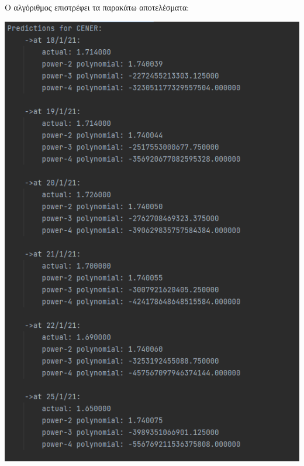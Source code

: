 \documentclass{article}
\newcommand{\gt}{\greektext}
\begin{document}
\pagebreak
\gt Ο αλγόριθμος επιστρέφει τα παρακάτω αποτελέσματα:
\begin{center}
    \includegraphics[scale=0.7]{images/cener_future.png}

\end{center}
\end{document}
